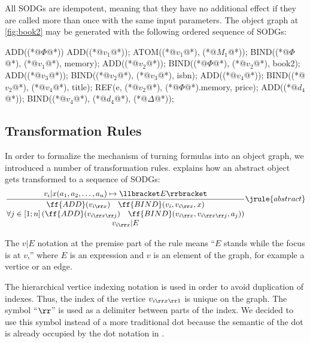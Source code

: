 All SODGs are idempotent, meaning that they have no additional effect
if they are called more than once with the same input parameters.
The object graph at \cref{fig:book2} may be generated with the
following ordered sequence of SODGs:

\begin{twocols}
\begin{ffcode}
ADD((*@\(\Phi\)@*))
ADD((*@\(v_1@\)*));
ATOM((*@\(v_1\)@*), (*@\(M_1\)@*));
BIND((*@\(\Phi\)@*), (*@\(v_1\)@*), memory);
ADD((*@\(v_2\)@*));
BIND((*@\(\Phi\)@*), (*@\(v_2\)@*), book2);
ADD((*@\(v_3\)@*));
BIND((*@\(v_2\)@*), (*@\(v_3\)@*), isbn);
ADD((*@\(v_4\)@*));
BIND((*@\(v_2\)@*), (*@\(v_4\)@*), title);
REF(e, (*@\(v_2\)@*), (*@\(\Phi\)@*).memory, price);
ADD((*@\(d_4\)@*));
BIND((*@\(v_4\)@*), (*@\(d_4\)@*), (*@\(\Delta\)@*));
\end{ffcode}
\end{twocols}

\subsection{Transformation Rules}

In order to formalize the mechanism of turning \phic{} formulas into an object graph,
we introduced a number of transformation rules.  explains how
an abstract object gets transformed to a sequence of SODGs:
\begin{equation*}
\dfrac
  {v_i | x(a_1, a_2, \dots, a_n) \mapsto \llbracket E \rrbracket}
  {\begin{matrix}
    \ff{ADD}(v_{i\rr x}) \quad \ff{BIND}(v_i, v_{i\rr x}, x) \\
    \forall j \in [1; n] \left( \ff{ADD}(v_{i\rr x\rr j}) \quad \ff{BIND}(v_{i\rr x}, v_{i\rr x\rr j}, a_j) \right) \\
    v_{i\rr x}|E
  \end{matrix}}
  \jrule{abstract}
\end{equation*}

The \(v|E\) notation at the premise part of the rule
means ``\(E\) stands while the focus is at \(v\),'' where
\(E\) is an expression and \(v\) is an element of the graph, for example a vertice or an edge.

The hierarchical vertice indexing notation is used in order to
avoid duplication of indexes. Thus, the index of the vertice
\(v_{i\rr x\rr 1}\) is unique on the graph. The symbol ``\(\rr\)'' is used
as a delimiter between parts of the index. We decided to use this symbol
instead of a more traditional dot because the semantic of the dot
is already occupied by the dot notation in \phic{}.

